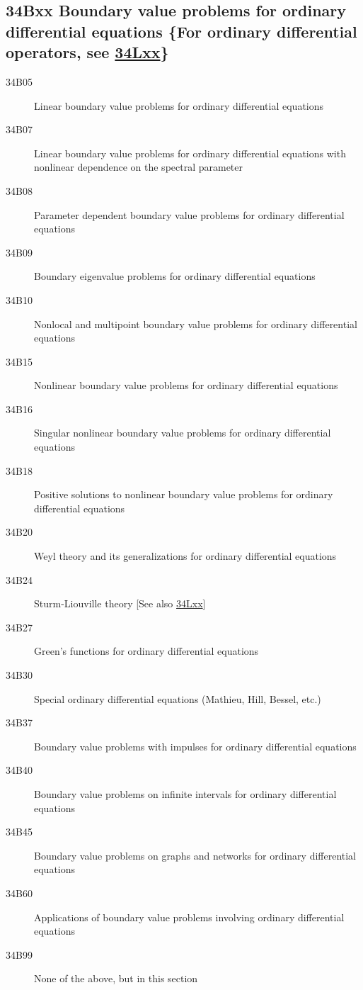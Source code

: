 \documentclass[letterpaper]{article}
\begin{document}
\subsection*{34Bxx  Boundary value problems for ordinary differential equations \{For ordinary differential operators, see \hyperref[34Lxx]{34Lxx}\} }\label{34Bxx}
\begin{description}  
\item [34B05]\label{34B05} Linear boundary value problems for ordinary differential equations
\item [34B07]\label{34B07} Linear boundary value problems for ordinary differential equations with nonlinear dependence on the spectral parameter
\item [34B08]\label{34B08} Parameter dependent boundary value problems for ordinary differential equations
\item [34B09]\label{34B09} Boundary eigenvalue problems for ordinary differential equations
\item [34B10]\label{34B10} Nonlocal and multipoint boundary value problems for ordinary differential equations
\item [34B15]\label{34B15} Nonlinear boundary value problems for ordinary differential equations
\item [34B16]\label{34B16} Singular nonlinear boundary value problems for ordinary differential equations
\item [34B18]\label{34B18} Positive solutions to nonlinear boundary value problems for ordinary differential equations
\item [34B20]\label{34B20} Weyl theory and its generalizations for ordinary differential equations
\item [34B24]\label{34B24} Sturm-Liouville theory [See also \hyperref[34Lxx]{34Lxx}]
\item [34B27]\label{34B27} Green's functions for ordinary differential equations
\item [34B30]\label{34B30} Special ordinary differential equations (Mathieu, Hill, Bessel, etc.)
\item [34B37]\label{34B37} Boundary value problems with impulses for ordinary differential equations
\item [34B40]\label{34B40} Boundary value problems on infinite intervals for ordinary differential equations
\item [34B45]\label{34B45} Boundary value problems on graphs and networks for ordinary differential equations
\item [34B60]\label{34B60} Applications of boundary value problems involving ordinary differential equations 
\item [34B99]\label{34B99} None of the above, but in this section
\end{description}
\end{document}
